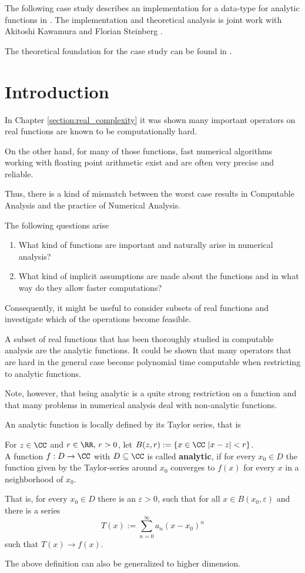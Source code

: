   The following case study describes an implementation for a data-type for
  analytic functions in \irram.
  The implementation and theoretical analysis is joint work with Akitoshi Kawamura and Florian
  Steinberg \cite{analyticpaper}.

  The theoretical foundation for the case study can be found in
  \cite{Kawamura}.
	\section{Introduction}
		In Chapter \ref{section:real_complexity} it was shown many important operators 
		on real functions are known to be computationally hard.

		On the other hand, for many of those functions, fast numerical algorithms working with 
    floating point arithmetic exist and are often very precise and reliable.

    Thus, there is a kind of mismatch between the worst case results in Computable Analysis
    and the practice of Numerical Analysis. 

    The following questions arise
		\begin{enumerate}
			\item What kind of functions are important and naturally arise in numerical analysis? 
			\item What kind of implicit assumptions are made about the functions and in what way do they allow faster computations? 
		\end{enumerate}

    Consequently, it might be useful to consider subsets of real functions and
    investigate which of the operations become feasible.

		A subset of real functions that has been thoroughly studied in computable analysis are the analytic functions.
    It could be shown that many operators that are hard in the general case become polynomial time computable when restricting 
    to analytic functions.
     
    Note, however, that being analytic is a quite strong restriction on a function and that many problems in 
    numerical analysis deal with non-analytic functions.

    An analytic function is locally defined by its Taylor series, that is
		\begin{definition}
			For $z \in \CC$ and $r \in \RR, \, r > 0$, let $B(z,r) := \{ x \in \CC \,\, | x - z | < r\}$. \\
			A function $f: D \to \CC$ with $D \subseteq \CC$ is called \textbf{analytic}, if for every $x_0 \in D$ 
			the function given by the Taylor-series around $x_0$ converges to $f(x)$ for every $x$ in a neighborhood of 
			$x_0$. 

			That is, for every $x_0 \in D$ there is an $\varepsilon > 0$, such that for all $x \in B(x_0, \varepsilon)$ and there is a series
			$$ T(x) := \sum_{n=0}^{\infty} a_n(x-x_0)^n$$
			such that $T(x) \rightarrow f(x)$.

		\end{definition}
		The above definition can also be generalized to higher dimension. 

